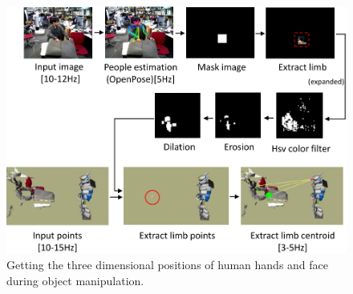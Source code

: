 \begin{figure}[htbp]
 \begin{center}
  \includegraphics[width=1.00\columnwidth]{figs/openpose2}
  \caption{Getting the three dimensional positions of human hands and face during object manipulation.}
  \label{figure:detecting_limbs}
 \end{center}
\end{figure}

